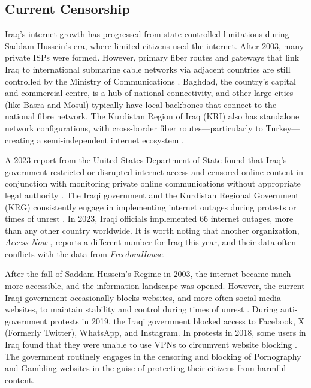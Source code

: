 \subsection{Current Censorship}
\label{sec:Iraq-Current-Censorship}

Iraq's internet growth has progressed from state-controlled limitations during Saddam Hussein's era, where limited citizens used the internet. After 2003, many private ISPs were formed. However, primary fiber routes and gateways that link Iraq to international submarine cable networks via adjacent countries are still controlled by the Ministry of Communications \cite{IraqCMC}. Baghdad, the country's capital and commercial centre, is a hub of national connectivity, and other large cities (like Basra and Mosul) typically have local backbones that connect to the national fibre network. The Kurdistan Region of Iraq (KRI) also has standalone network configurations, with cross-border fiber routes—particularly to Turkey—creating a semi-independent internet ecosystem \cite{freedomhouseIraqFreedom}. 

A 2023 report from the United States Department of State found that Iraq's government restricted or disrupted internet access and censored online content in conjunction with monitoring private online communications without appropriate legal authority \cite{USDoSIraq2023}. The Iraqi government and the Kurdistan Regional Government (KRG) consistently engage in implementing internet outages during protests or times of unrest \cite{freedomhouseIraqFreedom}. In 2023, Iraqi officials implemented 66 internet outages, more than any other country worldwide. It is worth noting that another organization, \textit{Access Now} \cite{accessnowBlackoutReport2023}, reports a different number for Iraq this year, and their data often conflicts with the data from \textit{FreedomHouse}.  

After the fall of Saddam Hussein's Regime in 2003, the internet became much more accessible, and the information landscape was opened. However, the current Iraqi government occasionally blocks websites, and more often social media websites, to maintain stability and control during times of unrest \cite{freedomhouseIraqFreedom}. During anti-government protests in 2019, the Iraqi government blocked access to Facebook, X (Formerly Twitter), WhatsApp, and Instagram. In protests in 2018, some users in Iraq found that they were unable to use VPNs to circumvent website blocking \cite{freedomhouseIraqFreedom}. The government routinely engages in the censoring and blocking of Pornography and Gambling websites in the guise of protecting their citizens from harmful content. 

